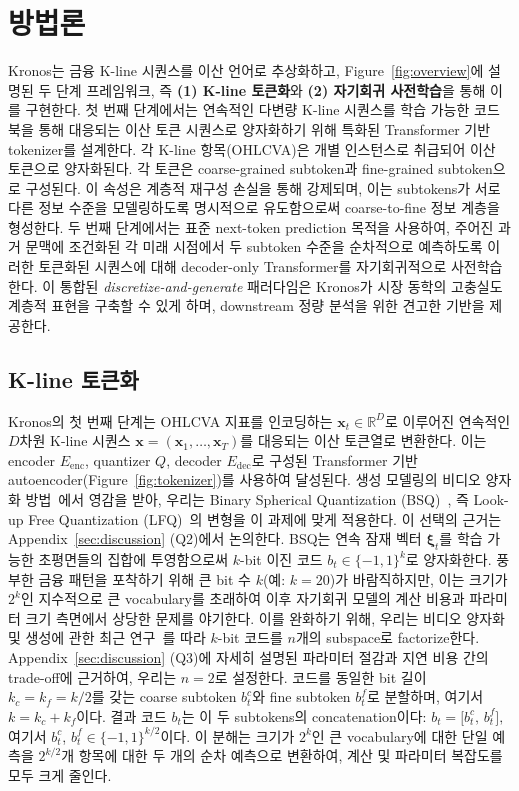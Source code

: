 \section{방법론}

Kronos는 금융 K-line 시퀀스를 이산 언어로 추상화하고, Figure~\ref{fig:overview}에 설명된 두 단계 프레임워크, 즉 \textbf{(1) K-line 토큰화}와 \textbf{(2) 자기회귀 사전학습}을 통해 이를 구현한다. 첫 번째 단계에서는 연속적인 다변량 K-line 시퀀스를 학습 가능한 코드북을 통해 대응되는 이산 토큰 시퀀스로 양자화하기 위해 특화된 Transformer 기반 tokenizer를 설계한다. 각 K-line 항목(OHLCVA)은 개별 인스턴스로 취급되어 이산 토큰으로 양자화된다. 각 토큰은 coarse-grained subtoken과 fine-grained subtoken으로 구성된다.
이 속성은 계층적 재구성 손실을 통해 강제되며, 이는 subtokens가 서로 다른 정보 수준을 모델링하도록 명시적으로 유도함으로써 coarse-to-fine 정보 계층을 형성한다.
두 번째 단계에서는 표준 next-token prediction 목적을 사용하여, 주어진 과거 문맥에 조건화된 각 미래 시점에서 두 subtoken 수준을 순차적으로 예측하도록 이러한 토큰화된 시퀀스에 대해 decoder-only Transformer를 자기회귀적으로 사전학습한다. 이 통합된 \emph{discretize-and-generate} 패러다임은 Kronos가 시장 동학의 고충실도 계층적 표현을 구축할 수 있게 하며, downstream 정량 분석을 위한 견고한 기반을 제공한다.

\subsection{K-line 토큰화}

Kronos의 첫 번째 단계는 OHLCVA 지표를 인코딩하는 $\mathbf{x}_{t}\in\mathbb{R}^{D}$로 이루어진 연속적인 $D$차원 K-line 시퀀스 $\mathbf{x} = (\mathbf{x}_{1}, \ldots, \mathbf{x}_{T})$를 대응되는 이산 토큰열로 변환한다. 이는 encoder $E_{\text{enc}}$, quantizer $Q$, decoder $E_{\text{dec}}$로 구성된 Transformer 기반 autoencoder(Figure~\ref{fig:tokenizer})를 사용하여 달성된다. 생성 모델링의 비디오 양자화 방법~\cite{van2017neural,yu2023language}에서 영감을 받아, 우리는 Binary Spherical Quantization (BSQ)~\cite{zhao2024image}, 즉 Look-up Free Quantization (LFQ)~\cite{yu2023language}의 변형을 이 과제에 맞게 적용한다.
이 선택의 근거는 Appendix~\ref{sec:discussion} (Q2)에서 논의한다.
BSQ는 연속 잠재 벡터 $\bm{\xi}_t$를 학습 가능한 초평면들의 집합에 투영함으로써 $k$-bit 이진 코드 $b_t \in \{-1,1\}^k$로 양자화한다. 풍부한 금융 패턴을 포착하기 위해 큰
bit 수 $k$(예: $k=20$)가 바람직하지만, 이는 크기가 $2^k$인 지수적으로 큰 vocabulary를 초래하여 이후 자기회귀 모델의 계산 비용과 파라미터 크기 측면에서 상당한 문제를 야기한다. 이를 완화하기 위해, 우리는 비디오 양자화 및 생성에 관한 최근 연구~\cite{yu2023language,wang2025bridging}를 따라 $k$-bit 코드를 $n$개의 subspace로 factorize한다. Appendix~\ref{sec:discussion} (Q3)에 자세히 설명된 파라미터 절감과 지연 비용 간의 trade-off에 근거하여, 우리는 $n=2$로 설정한다. 코드를 동일한 bit 길이 $k_c = k_f = k/2$를 갖는 coarse subtoken $b_{t}^{c}$와 fine subtoken $b_{t}^{f}$로 분할하며, 여기서 $k=k_c+k_f$이다. 결과 코드 $b_t$는 이 두 subtokens의 concatenation이다:
\(
  b_{t} = \bigl[b_{t}^{c},\,b_{t}^{f}\bigr],
\)
여기서 $b_{t}^{c}$, $b_{t}^{f} \in\{-1,1\}^{k/2}$이다. 이 분해는 크기가 $2^k$인 큰 vocabulary에 대한 단일 예측을 $2^{k/2}$개 항목에 대한 두 개의 순차 예측으로 변환하여, 계산 및 파라미터 복잡도를 모두 크게 줄인다.

